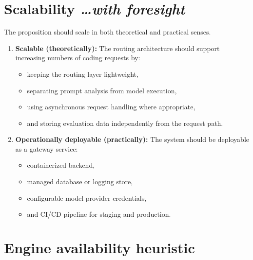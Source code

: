 \documentclass[11pt,a4paper]{article}
\newcommand{\BvrHint}[1]{%
  {\normalfont\normalsize\itshape\hfill #1}%
}
\begin{document}
\section{Scalability%
  \texorpdfstring{\BvrHint{\ldots with foresight}}{}}

The proposition should scale in both theoretical and
practical senses.

\begin{enumerate}[leftmargin=0.7cm]

    \item \textbf{Scalable (theoretically):} The routing
    architecture should support increasing numbers of coding
    requests by:

    \begin{itemize}[leftmargin=0.7cm]
        \item keeping the routing layer lightweight,
        \item separating prompt analysis from model execution,
        \item using asynchronous request handling where
        appropriate,
        \item and storing evaluation data independently from
        the request path.
    \end{itemize}

    \item \textbf{Operationally deployable (practically):}
    The system should be deployable as a gateway service:

    \begin{itemize}[leftmargin=0.7cm]
        \item containerized backend,
        \item managed database or logging store,
        \item configurable model-provider credentials,
        \item and CI/CD pipeline for staging and production.
    \end{itemize}

\end{enumerate}

\section{Engine availability heuristic}
\end{document}
